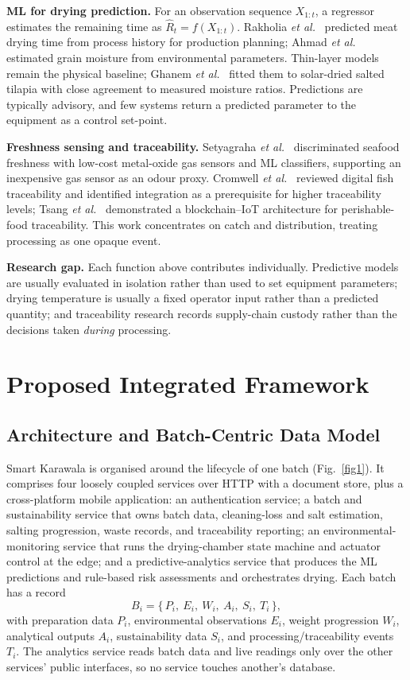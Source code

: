 \documentclass[conference]{IEEEtran}
\begin{document}
\textbf{ML for drying prediction.} For an observation sequence
$X_{1:t}$, a regressor estimates the remaining time as
$\hat{R}_{t} = f(X_{1:t})$. Rakholia \textit{et al.}~\cite{b4} predicted
meat drying time from process history for production planning; Ahmad
\textit{et al.}~\cite{b5} estimated grain moisture from environmental
parameters. Thin-layer models remain the physical baseline; Ghanem
\textit{et al.}~\cite{b6} fitted them to solar-dried salted tilapia with
close agreement to measured moisture ratios. Predictions are typically
advisory, and few systems return a predicted parameter to the equipment as
a control set-point.

\textbf{Freshness sensing and traceability.} Setyagraha \textit{et
al.}~\cite{b8} discriminated seafood freshness with low-cost metal-oxide
gas sensors and ML classifiers, supporting an inexpensive gas sensor as an
odour proxy. Cromwell \textit{et al.}~\cite{b10} reviewed digital fish
traceability and identified integration as a prerequisite for higher
traceability levels; Tsang \textit{et al.}~\cite{b11} demonstrated a
blockchain--IoT architecture for perishable-food traceability. This work
concentrates on catch and distribution, treating processing as one opaque
event.

\textbf{Research gap.} Each function above contributes individually.
Predictive models are usually evaluated in isolation rather than used to
set equipment parameters; drying temperature is usually a fixed operator
input rather than a predicted quantity; and traceability research records
supply-chain custody rather than the decisions taken \emph{during}
processing.

\section{Proposed Integrated Framework}

\subsection{Architecture and Batch-Centric Data Model}
Smart Karawala is organised around the lifecycle of one batch
(Fig.~\ref{fig1}). It comprises four loosely coupled services over HTTP
with a document store, plus a cross-platform mobile application: an
authentication service; a batch and sustainability service that owns batch
data, cleaning-loss and salt estimation, salting progression, waste
records, and traceability reporting; an environmental-monitoring service
that runs the drying-chamber state machine and actuator control at the
edge; and a predictive-analytics service that produces the ML predictions
and rule-based risk assessments and orchestrates drying. Each batch has a
record
\begin{equation}
B_{i} = \{\,P_{i},\ E_{i},\ W_{i},\ A_{i},\ S_{i},\ T_{i}\,\},\label{eq3}
\end{equation}
with preparation data $P_{i}$, environmental observations $E_{i}$, weight
progression $W_{i}$, analytical outputs $A_{i}$, sustainability data
$S_{i}$, and processing/traceability events $T_{i}$. The analytics service
reads batch data and live readings only over the other services' public
interfaces, so no service touches another's database.
\end{document}
